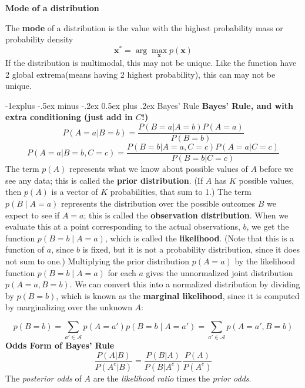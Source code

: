 \documentclass[10pt,landscape]{article}
\makeatletter
\renewcommand{\subsection}{\@startsection{subsection}{2}{0mm}%
                                {-1explus -.5ex minus -.2ex}%
                                {0.5ex plus .2ex}%
                                {\normalfont\normalsize\bfseries}}
\makeatother
\begin{document}
\begin{multicols*}{3}
    \textbf{Mode of a distribution}
   
    The \textbf{mode} of a distribution is the value with the highest probability mass or probability density
    \begin{equation*}
        \mathbf{x^*}= \arg \max_{\mathbf{x}} p(\mathbf{x})
    \end{equation*}
    If the distribution is multimodal, this may not be unique. Like the function have 2 global extrema(means having 2 highest probability), this can may not be unique.

\subsection{Bayes' Rule}    
\textbf{Bayes' Rule, and with extra conditioning (just add in $C$!)}
         \[P({ A=a}|{ B=b})  = \frac{P({ B=a}|{ A=b})P({ A=a})}{P({ B=b})}\]
         \[P({ A=a}|{ B=b}, { C=c}) = \frac{P({ B=b}|{ A=a}, { C=c})P({ A=a} | { C=c})}{P({ B=b} | { C=c})}\]
  The term \( p(A) \) represents what we know about possible values of \( A \) before we see any data; this is called the \textbf{prior distribution}. (If \( A \) has \( K \) possible values, then \( p(A) \) is a vector of \( K \) probabilities, that sum to 1.) The term \( p(B \mid A = a) \) represents the distribution over the possible outcomes \( B \) we expect to see if \( A = a \); this is called the \textbf{observation distribution}. When we evaluate this at a point corresponding to the actual observations, \( b \), we get the function \( p(B = b \mid A = a) \), which is called the \textbf{likelihood}. (Note that this is a function of \( a \), since \( b \) is fixed, but it is not a probability distribution, since it does not sum to one.) Multiplying the prior distribution \( p(A = a) \) by the likelihood function \( p(B = b \mid A = a) \) for each \( a \) gives the unnormalized joint distribution \( p(A = a, B = b) \). We can convert this into a normalized distribution by dividing by \( p(B = b) \), which is known as the \textbf{marginal likelihood}, since it is computed by marginalizing over the unknown \( A \):

\begin{equation*}
    p(B = b) = \sum_{a' \in \mathcal{A}} p(A = a') p(B = b \mid A = a') 
    = \sum_{a' \in \mathcal{A}} p(A = a', B = b)
\end{equation*}
\textbf{Odds Form of Bayes' Rule}
\[\frac{P({ A}| { B})}{P({ A^c}| { B})} = \frac{P({ B}|{ A})}{P({ B}| { A^c})}\frac{P({ A})}{P({ A^c})}\]
The \emph{posterior odds} of $A$ are the \emph{likelihood ratio} times the \emph{prior odds}. 

\end{multicols*}
\end{document}
